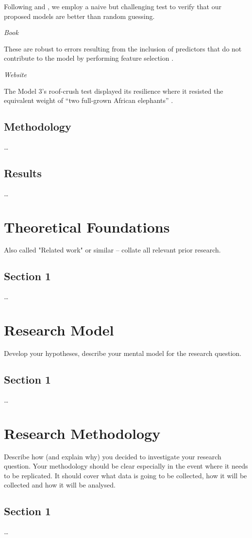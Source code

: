 \documentclass{thesisclass}
\begin{document}
Following \citet{conejo2005day} and \citet{misiorek2006point}, we employ a naive but challenging test to verify that our proposed models are better than random guessing.

\emph{Book}

These are robust to errors resulting from the inclusion of predictors that do not contribute to the model by performing feature selection \citep{kuhn2013applied}.

\emph{Website}

The Model 3's roof-crush test displayed its resilience where it resisted the equivalent weight of ``two full-grown African elephants'' \citep{Model3Tesla2021}.

\section{Methodology}\dots
\section{Results}\dots

\chapter{Theoretical Foundations} Also called "Related work" or similar – collate all relevant prior research. 
\section{Section 1}\dots

\chapter{Research Model} Develop your hypotheses, describe your mental model for the research question.
\section{Section 1}\dots


\chapter{Research Methodology} Describe how (and explain why) you decided to investigate your research question. Your methodology should be clear especially in the event where it needs to be replicated. It should cover what data is going to be collected, how it will be collected and how it will be analysed.
\section{Section 1}\dots
\end{document}
